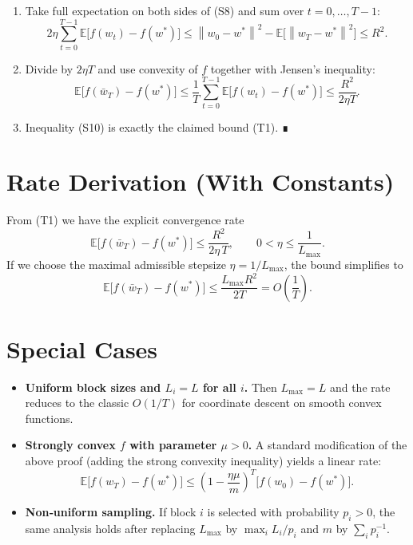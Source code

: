 \documentclass{article}
\newcommand{\E}{\mathbb{E}}
\newcommand{\norm}[1]{\left\|#1\right\|}
\begin{document}
\begin{enumerate}
\item[Step 8.] Take full expectation on both sides of (S8) and sum over $t=0,\dots ,T-1$:
\[
2\eta\sum_{t=0}^{T-1}\E\!\bigl[f(w_t)-f(w^{\ast})\bigr]
\le
\norm{w_0-w^{\ast}}^{2}
-\E\!\bigl[\norm{w_T-w^{\ast}}^{2}\bigr]
\le R^{2}.
\tag{S9}
\]

\item[Step 9.] Divide by $2\eta T$ and use convexity of $f$ together with Jensen’s inequality:
\[
\E\!\bigl[f(\bar w_T)-f(w^{\ast})\bigr]
\le
\frac{1}{T}\sum_{t=0}^{T-1}\E\!\bigl[f(w_t)-f(w^{\ast})\bigr]
\le
\frac{R^{2}}{2\eta T}.
\tag{S10}
\]

\item[Step 10.] Inequality (S10) is exactly the claimed bound (T1). ∎
\end{enumerate}

\section*{Rate Derivation (With Constants)}
From (T1) we have the explicit convergence rate
\[
\boxed{\;
\E\!\bigl[f(\bar w_T)-f(w^{\ast})\bigr]
\le
\frac{R^{2}}{2\eta\,T},
\qquad
0<\eta\le\frac{1}{L_{\max}}.
\;}
\]
If we choose the maximal admissible stepsize $\eta=1/L_{\max}$, the bound simplifies to
\[
\E\!\bigl[f(\bar w_T)-f(w^{\ast})\bigr]
\le
\frac{L_{\max}R^{2}}{2T}=O\!\left(\frac{1}{T}\right).
\]

\section*{Special Cases}
\begin{itemize}
\item \textbf{Uniform block sizes and $L_i=L$ for all $i$.} Then $L_{\max}=L$ and the rate reduces to the classic $O(1/T)$ for coordinate descent on smooth convex functions.
\item \textbf{Strongly convex $f$ with parameter $\mu>0$.} A standard modification of the above proof (adding the strong convexity inequality) yields a linear rate:
\[
\E\!\bigl[f(w_T)-f(w^{\ast})\bigr]\le
\left(1-\frac{\eta\mu}{m}\right)^{T}\bigl[f(w_0)-f(w^{\ast})\bigr].
\]
\item \textbf{Non‑uniform sampling.} If block $i$ is selected with probability $p_i>0$, the same analysis holds after replacing $L_{\max}$ by $\max_i L_i/p_i$ and $m$ by $\sum_i p_i^{-1}$.
\end{itemize}
\end{document}
